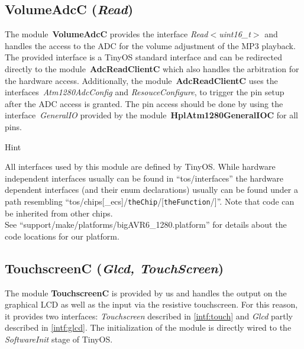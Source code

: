 \documentclass[a4paper,10pt]{article}
\newenvironment{hint}[1][Hint]{%
	\begin{bclogo}[noborder=true,logo=\bclampe]{#1}
}
{\end{bclogo}}
\newcommand{\module}[1]{\textbf{#1}}
\def\interface#1{{\em #1\/}}
\begin{document}
\subsection{VolumeAdcC ({\interface{Read}})}
\label{sec:voladc}

The module~\module{VolumeAdcC} provides the interface
	\interface{Read$<$uint16\_t$>$} and handles the access to the ADC for
	the volume adjustment of the MP3 playback.
The provided interface is a TinyOS standard interface and can be redirected
	directly to the module~\module{AdcReadClientC} which also handles the
	arbitration for the hardware access.
Additionally, the module~\module{AdcReadClientC} uses the
	interfaces~\interface{Atm1280AdcConfig} and \interface{ResouceConfigure},
	to trigger the pin setup after the ADC access is granted.
The pin access should be done by using the interface~\interface{GeneralIO}
	provided by the module~\module{HplAtm1280GeneralIOC} for all pins.

\begin{hint}
	All interfaces used by this module are defined by TinyOS.
	While hardware independent interfaces usually can be found in
	``tos/interfaces'' the hardware dependent interfaces (and their enum
	declarations) usually can be found under a path resembling
	``tos/chips[\_ecs]/\texttt{theChip}/[\texttt{theFunction}/]''.
	Note that code can be inherited from other chips.\\
	See ``support/make/platforms/bigAVR6\_1280.platform'' for details about
		the code locations for our platform.
\end{hint}



\subsection{TouchscreenC ({\interface{Glcd, TouchScreen}})}

The module \module{TouchscreenC} is provided by us and handles the output on
	the graphical LCD as well as the input via the resistive touchscreen.
For this reason, it provides two interfaces: \interface{Touchscreen} described
	in \cref{intf:touch} and \interface{Glcd} partly described in
	\cref{intf:glcd}.
The initialization of the module is directly wired to the \emph{SoftwareInit}
	stage of TinyOS.
\end{document}
